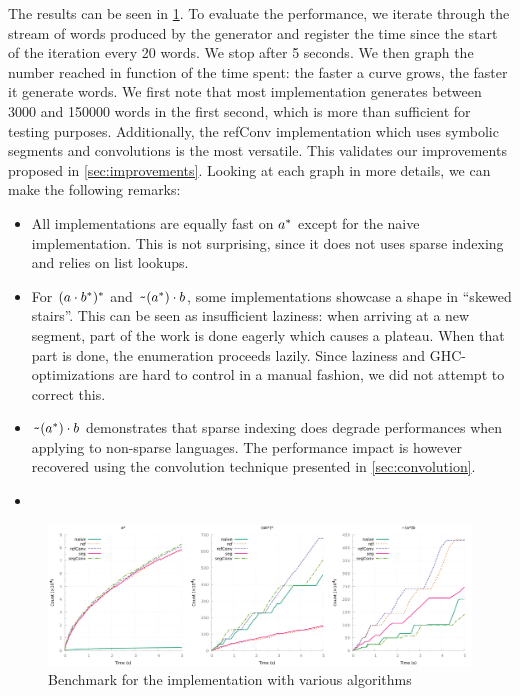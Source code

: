 The results can be seen in \cref{bench:haskell:all}.
To evaluate the performance, we iterate through the stream of words produced by
the generator and register the time since the start of the iteration
every 20 words. We stop after 5 seconds. We then graph the number reached in
function of the time spent: the faster a curve grows, the faster it generate
words.
We first note that most implementation generates between 3000 and
150000 words in the first second, which is more than sufficient for testing
purposes.
Additionally, the refConv implementation
which uses symbolic segments and convolutions
is the most versatile. This validates our improvements
proposed in \cref{sec:improvements}.
Looking at each graph in more details, we can make the following remarks:
\begin{itemize}[leftmargin=*]
\item All implementations are equally fast on $a^*$ except
for the naive implementation. This is not surprising, since it does not uses
sparse indexing and relies on list lookups.
\item 
For $(a \cdot{b^*})^*$ and
$\texttt{\textasciitilde}{(a^*)} \cdot{b}$, some implementations showcase
a shape in ``skewed stairs''. This can be seen as insufficient laziness:
when arriving at a new segment, part of the work is done eagerly which causes
a plateau. When that part is done, the enumeration proceeds lazily.
Since laziness and GHC-optimizations are hard to control in a manual fashion,
we did not attempt to correct this.
\item $\texttt{\textasciitilde}{(a^*)} \cdot{b}$ demonstrates that sparse indexing
  does degrade performances when applying  to non-sparse languages.
  The performance impact is however recovered using the convolution technique
  presented in \cref{sec:convolution}.
\item {}
\end{itemize}

\begin{figure}[h]
  \centering
  \includegraphics[width=\linewidth]{measure/haskell_all.png}
  \caption{Benchmark for the \haskell implementation with various algorithms}
  \label{bench:haskell:all}
\end{figure}

